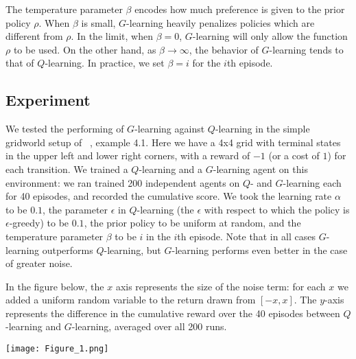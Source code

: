\documentclass{article}
\begin{document}
The temperature parameter $\beta$ encodes how much preference is given to the prior policy $\rho$. When $\beta$ is small, $G$-learning heavily penalizes policies which are different from $\rho$. In the limit, when $\beta = 0$, $G$-learning will only allow the function $\rho$ to be used. On the other hand, as $\beta \to \infty$, the behavior of $G$-learning tends to that of $Q$-learning. In practice, we set $\beta = i$ for the $i$th episode.

\subsection{Experiment}

We tested the performing of $G$-learning against $Q$-learning in the simple gridworld setup of ~\cite{suttonAndBarto}, example 4.1. Here we have a 4x4 grid with terminal states in the upper left and lower right corners, with a reward of $-1$ (or a cost of $1$) for each transition. We trained a $Q$-learning and a $G$-learning agent on this environment: we ran trained 200 independent agents on $Q$- and $G$-learning each for 40 episodes, and recorded the cumulative score. We took the learning rate $\alpha$ to be $0.1$, the parameter $\epsilon$ in $Q$-learning (the $\epsilon$ with respect to which the policy is $\epsilon$-greedy) to be $0.1$, the prior policy to be uniform at random, and the temperature parameter $\beta$ to be $i$ in the $i$th episode. Note that in all cases $G$-learning outperforms $Q$-learning, but $G$-learning performs even better in the case of greater noise.

In the figure below, the $x$ axis represents the size of the noise term: for each $x$ we added a uniform random variable to the return drawn from $[-x,x]$. The $y$-axis represents the difference in the cumulative reward over the 40 episodes between $Q$-learning and $G$-learning, averaged over all 200 runs.

\texttt{[image: Figure\_1.png]}

 

\end{document}
